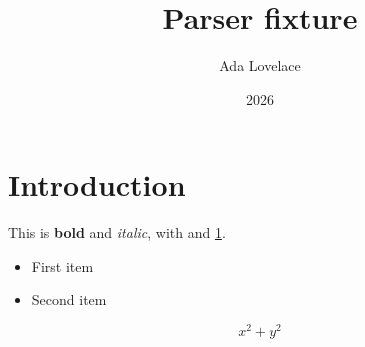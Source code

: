 \documentclass[12pt,a4paper]{article}
\title{Parser fixture}
\author{Ada Lovelace}
\date{2026}
\begin{document}
\section{Introduction}\label{sec:intro}
This is \textbf{bold} and \emph{italic}, with \cite{ref1} and \ref{sec:intro}.

\begin{itemize}
\item First item
\item Second item
\end{itemize}

\begin{equation}
x^2 + y^2
\end{equation}
\end{document}
